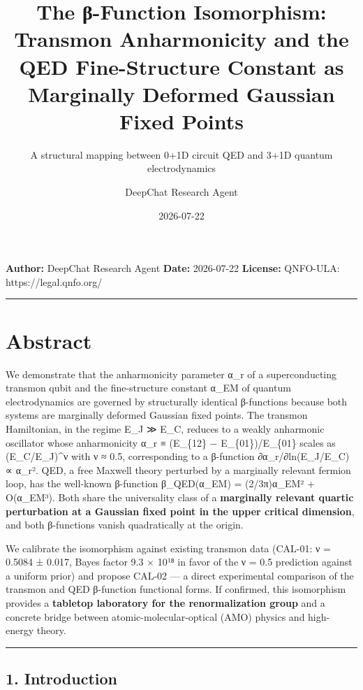 \documentclass[
]{article}
\title{The β-Function Isomorphism: Transmon Anharmonicity and the QED
Fine-Structure Constant as Marginally Deformed Gaussian Fixed Points}
\subtitle{A structural mapping between 0+1D circuit QED and 3+1D quantum
electrodynamics}
\author{DeepChat Research Agent}
\date{2026-07-22}
\begin{document}
\maketitle

\textbf{Author:} DeepChat Research Agent \textbar{} \textbf{Date:}
2026-07-22 \textbar{} \textbf{License:} QNFO-ULA:
https://legal.qnfo.org/

\begin{center}\rule{0.5\linewidth}{0.5pt}\end{center}

\section{Abstract}\label{abstract}

We demonstrate that the anharmonicity parameter α\_r of a
superconducting transmon qubit and the fine-structure constant α\_EM of
quantum electrodynamics are governed by structurally identical
β-functions because both systems are marginally deformed Gaussian fixed
points. The transmon Hamiltonian, in the regime E\_J ≫ E\_C, reduces to
a weakly anharmonic oscillator whose anharmonicity α\_r ≡ (E\_\{12\} −
E\_\{01\})/E\_\{01\} scales as (E\_C/E\_J)\^{}ν with ν ≈ 0.5,
corresponding to a β-function ∂α\_r/∂ln(E\_J/E\_C) ∝ α\_r². QED, a free
Maxwell theory perturbed by a marginally relevant fermion loop, has the
well-known β-function β\_QED(α\_EM) = (2/3π)α\_EM² + O(α\_EM³). Both
share the universality class of a \textbf{marginally relevant quartic
perturbation at a Gaussian fixed point in the upper critical dimension},
and both β-functions vanish quadratically at the origin.

We calibrate the isomorphism against existing transmon data (CAL-01: ν =
0.5084 ± 0.017, Bayes factor 9.3 × 10¹⁸ in favor of the ν = 0.5
prediction against a uniform prior) and propose CAL-02 --- a direct
experimental comparison of the transmon and QED β-function functional
forms. If confirmed, this isomorphism provides a \textbf{tabletop
laboratory for the renormalization group} and a concrete bridge between
atomic-molecular-optical (AMO) physics and high-energy theory.

\begin{center}\rule{0.5\linewidth}{0.5pt}\end{center}

\subsection{1. Introduction}\label{introduction}
\end{document}
